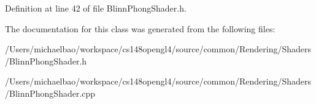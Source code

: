 Definition at line 42 of file Blinn\+Phong\+Shader.\+h.



The documentation for this class was generated from the following files\+:\begin{DoxyCompactItemize}
\item 
/\+Users/michaelbao/workspace/cs148opengl4/source/common/\+Rendering/\+Shaders/Blinn\+Phong\+Shader.\+h\item 
/\+Users/michaelbao/workspace/cs148opengl4/source/common/\+Rendering/\+Shaders/Blinn\+Phong\+Shader.\+cpp\end{DoxyCompactItemize}

